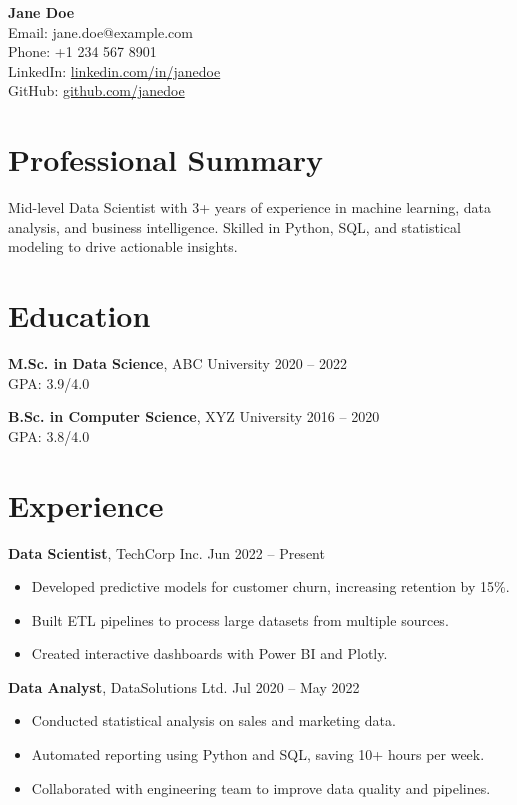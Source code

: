 \documentclass[11pt,a4paper]{article}
\begin{document}
\begin{center}
    {\LARGE \textbf{Jane Doe}}\\
    \vspace{2mm}
    Email: jane.doe@example.com \\
    Phone: +1 234 567 8901 \\
    LinkedIn: \href{https://linkedin.com/in/janedoe}{linkedin.com/in/janedoe} \\
    GitHub: \href{https://github.com/janedoe}{github.com/janedoe}
\end{center}

\section*{Professional Summary}
Mid-level Data Scientist with 3+ years of experience in machine learning, data analysis, and business intelligence. Skilled in Python, SQL, and statistical modeling to drive actionable insights.

\section*{Education}
\textbf{M.Sc. in Data Science}, ABC University \hfill 2020 -- 2022 \\
GPA: 3.9/4.0

\textbf{B.Sc. in Computer Science}, XYZ University \hfill 2016 -- 2020 \\
GPA: 3.8/4.0

\section*{Experience}

\textbf{Data Scientist}, TechCorp Inc. \hfill Jun 2022 -- Present
\begin{itemize}[noitemsep]
    \item Developed predictive models for customer churn, increasing retention by 15\%.
    \item Built ETL pipelines to process large datasets from multiple sources.
    \item Created interactive dashboards with Power BI and Plotly.
\end{itemize}

\textbf{Data Analyst}, DataSolutions Ltd. \hfill Jul 2020 -- May 2022
\begin{itemize}[noitemsep]
    \item Conducted statistical analysis on sales and marketing data.
    \item Automated reporting using Python and SQL, saving 10+ hours per week.
    \item Collaborated with engineering team to improve data quality and pipelines.
\end{itemize}
\end{document}
